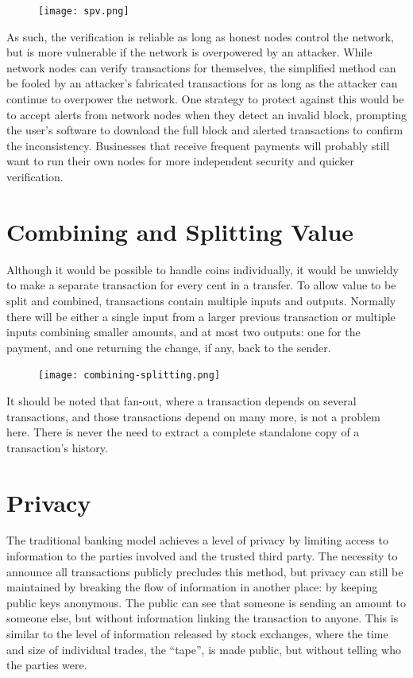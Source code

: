\documentclass[a4paper, 10pt]{article}
\begin{document}
\begin{figure}[!h]
\centering
\texttt{[image: spv.png]}

\end{figure}

As such, the verification is reliable as long as honest nodes control
the network, but is more vulnerable if the network is overpowered by an
attacker. While network nodes can verify transactions for themselves,
the simplified method can be fooled by an attacker's fabricated
transactions for as long as the attacker can continue to overpower the
network. One strategy to protect against this would be to accept alerts
from network nodes when they detect an invalid block, prompting the
user's software to download the full block and alerted transactions to
confirm the inconsistency. Businesses that receive frequent payments
will probably still want to run their own nodes for more independent
security and quicker verification.

\section{Combining and Splitting
Value}\label{combining-and-splitting-value}

Although it would be possible to handle coins individually, it would be
unwieldy to make a separate transaction for every cent in a transfer. To
allow value to be split and combined, transactions contain multiple
inputs and outputs. Normally there will be either a single input from a
larger previous transaction or multiple inputs combining smaller
amounts, and at most two outputs: one for the payment, and one returning
the change, if any, back to the sender.

\begin{figure}[!h]
\centering
\texttt{[image: combining-splitting.png]}

\end{figure}

It should be noted that fan-out, where a transaction depends on several
transactions, and those transactions depend on many more, is not a
problem here. There is never the need to extract a complete standalone
copy of a transaction's history.

\section{Privacy}\label{privacy}

The traditional banking model achieves a level of privacy by limiting access to information to the parties involved and the trusted third party. The necessity to announce all transactions publicly precludes this method, but privacy can still be maintained by breaking the flow of information in another place: by keeping public keys anonymous. The public can see that someone is sending an amount to someone else, but without information linking the transaction to anyone. This is similar to the level of information released by stock exchanges, where the time and size of individual trades, the ``tape'', is made public, but without telling who the parties were.
\end{document}
